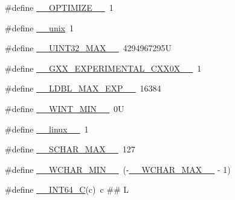 \begin{DoxyCompactItemize}
\#define \hyperlink{build-analizer__host-_desktop___qt__5__9__0___g_c_c__64bit-_release_2moc__predefs_8h_a5bcf2962d7a37c34484cef13fa9601b2}{\+\_\+\+\_\+\+O\+P\+T\+I\+M\+I\+Z\+E\+\_\+\+\_\+}~1
\item 
\#define \hyperlink{build-analizer__host-_desktop___qt__5__9__0___g_c_c__64bit-_release_2moc__predefs_8h_ac3cd8b035cfb8a68f6d1119ace36f1cc}{\+\_\+\+\_\+unix}~1
\item 
\#define \hyperlink{build-analizer__host-_desktop___qt__5__9__0___g_c_c__64bit-_release_2moc__predefs_8h_ab4425dccbcddb2363a2a8a67367a5b42}{\+\_\+\+\_\+\+U\+I\+N\+T32\+\_\+\+M\+A\+X\+\_\+\+\_\+}~4294967295\+U
\item 
\#define \hyperlink{build-analizer__host-_desktop___qt__5__9__0___g_c_c__64bit-_release_2moc__predefs_8h_a213133a8dca206becf88c2e3523b124a}{\+\_\+\+\_\+\+G\+X\+X\+\_\+\+E\+X\+P\+E\+R\+I\+M\+E\+N\+T\+A\+L\+\_\+\+C\+X\+X0\+X\+\_\+\+\_\+}~1
\item 
\#define \hyperlink{build-analizer__host-_desktop___qt__5__9__0___g_c_c__64bit-_release_2moc__predefs_8h_ae221a8e373285cf10c22926762f477f5}{\+\_\+\+\_\+\+L\+D\+B\+L\+\_\+\+M\+A\+X\+\_\+\+E\+X\+P\+\_\+\+\_\+}~16384
\item 
\#define \hyperlink{build-analizer__host-_desktop___qt__5__9__0___g_c_c__64bit-_release_2moc__predefs_8h_a135696718aa5b38e58be73aaece6654f}{\+\_\+\+\_\+\+W\+I\+N\+T\+\_\+\+M\+I\+N\+\_\+\+\_\+}~0\+U
\item 
\#define \hyperlink{build-analizer__host-_desktop___qt__5__9__0___g_c_c__64bit-_release_2moc__predefs_8h_a1b27e3508a4c1e97875297882a95f503}{\+\_\+\+\_\+linux\+\_\+\+\_\+}~1
\item 
\#define \hyperlink{build-analizer__host-_desktop___qt__5__9__0___g_c_c__64bit-_release_2moc__predefs_8h_a87b7ceac2198cab045e40c9a64b11679}{\+\_\+\+\_\+\+S\+C\+H\+A\+R\+\_\+\+M\+A\+X\+\_\+\+\_\+}~127
\item 
\#define \hyperlink{build-analizer__host-_desktop___qt__5__9__0___g_c_c__64bit-_release_2moc__predefs_8h_a01b915d3ec5439de746f1d5e9f76dc3d}{\+\_\+\+\_\+\+W\+C\+H\+A\+R\+\_\+\+M\+I\+N\+\_\+\+\_\+}~(-\/\hyperlink{build-analizer__host-_desktop___qt__5__9__0___g_c_c__64bit-_release_2moc__predefs_8h_a65ac8cd0434319a3a31dc031409c218a}{\+\_\+\+\_\+\+W\+C\+H\+A\+R\+\_\+\+M\+A\+X\+\_\+\+\_\+} -\/ 1)
\item 
\#define \hyperlink{build-analizer__host-_desktop___qt__5__9__0___g_c_c__64bit-_release_2moc__predefs_8h_a4b8971e411b88166747d2a3c2425eaee}{\+\_\+\+\_\+\+I\+N\+T64\+\_\+\+C}(c)~c \#\# L
\item 

\end{DoxyCompactItemize}
